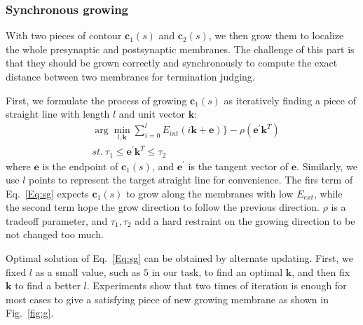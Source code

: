 \subsubsection{Synchronous growing}
With two pieces of contour $\mathbf{c}_1(s)$ and $\mathbf{c}_2(s)$, we then grow them to localize the whole presynaptic and postsynaptic membranes.
The challenge of this part is that they should be grown correctly and synchronously to compute the exact distance between two membranes for termination judging.

First, we formulate the process of growing $\mathbf{c}_1(s)$ as iteratively finding a piece of straight line with length $l$ and unit vector $\mathbf{k}$:
\begin{eqnarray}\label{Eq:sg}
&\arg\min\limits_{l,\mathbf{k}} \sum\limits_{i=0}^{l}E_{int}(i\mathbf{k}+\mathbf{e})\}-\rho(\mathbf{e}^{'}\mathbf{k}^{T})\\
&st.~\tau_1\leq \mathbf{e}^{'}\mathbf{k}^{T}\leq \tau_2\nonumber
\end{eqnarray}
where $\mathbf{e}$ is the endpoint of $\mathbf{c}_1(s)$, and $\mathbf{e}^{'}$ is the tangent vector of $\mathbf{e}$.
Similarly, we use $l$ points to represent the target straight line for convenience.
The firs term of Eq.~\ref{Eq:sg} expects $\mathbf{c}_1(s)$ to grow along the membranes with low $E_{ext}$, while the second term hope the grow direction to follow the previous direction.
$\rho$ is a tradeoff parameter, and $\tau_1,\tau_2$ add a hard restraint on the growing direction to be not changed too much.

Optimal solution of Eq.~\ref{Eq:sg} can be obtained by alternate updating.
First, we fixed $l$ as a small value, such as $5$ in our task, to find an optimal $\mathbf{k}$, and then fix $\mathbf{k}$ to find a better $l$.
Experiments show that two times of iteration is enough for most cases to give a satisfying piece of new growing membrane as shown in Fig.~\ref{fig:g}.

